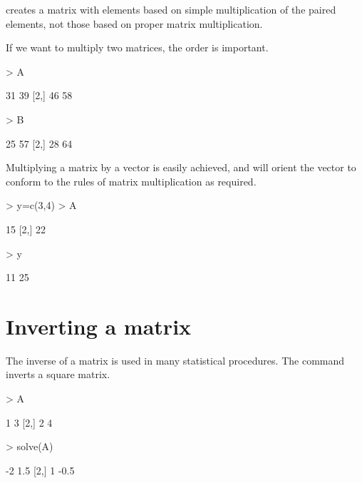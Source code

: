 creates a matrix with elements based on simple multiplication of the paired elements, not those based on proper matrix multiplication. 
 
If we want to multiply two matrices, the order is important. 

\begin{Schunk}
\begin{Sinput}
> A%*%B 
\end{Sinput}
\begin{Soutput}
     [,1] [,2]
[1,]   31   39
[2,]   46   58
\end{Soutput}
\begin{Sinput}
> B%*%A 
\end{Sinput}
\begin{Soutput}
     [,1] [,2]
[1,]   25   57
[2,]   28   64
\end{Soutput}
\end{Schunk}

 
Multiplying a matrix by a vector is easily achieved, and \R{} will orient the vector to conform to the rules of matrix multiplication as required. 

\begin{Schunk}
\begin{Sinput}
> y=c(3,4) 
> A%*%y 
\end{Sinput}
\begin{Soutput}
     [,1]
[1,]   15
[2,]   22
\end{Soutput}
\begin{Sinput}
> y%*%A 
\end{Sinput}
\begin{Soutput}
     [,1] [,2]
[1,]   11   25
\end{Soutput}
\end{Schunk}

 
\section{Inverting a matrix} 
 
The inverse of a matrix is used in many statistical procedures. The  command inverts a square matrix. 

\begin{Schunk}
\begin{Sinput}
> A 
\end{Sinput}
\begin{Soutput}
     [,1] [,2]
[1,]    1    3
[2,]    2    4
\end{Soutput}
\begin{Sinput}
> solve(A) 
\end{Sinput}
\begin{Soutput}
     [,1] [,2]
[1,]   -2  1.5
[2,]    1 -0.5
\end{Soutput}
\end{Schunk}

